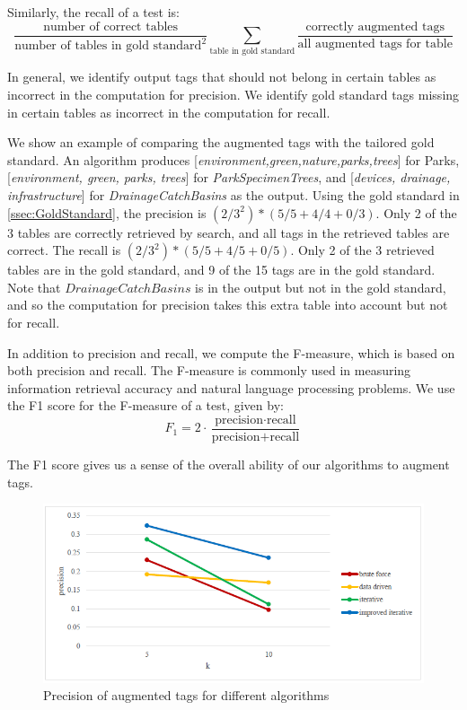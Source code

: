 Similarly, the recall of a test is:
\[
\frac{\text{number of correct tables}}{\text{number of tables in gold standard}^{2}}\sum\limits _{\text{table in gold standard}}\frac{\text{correctly augmented tags}}{\text{all augmented tags for table}}
\]

In general, we identify output tags that should not belong in certain tables as incorrect in the computation for precision. We identify gold standard tags missing in certain tables as incorrect in the computation for recall.

We show an example of comparing the augmented tags with the tailored gold standard. An algorithm produces [\textit{environment,green,nature,parks,trees}] for Parks, [\textit{environment, green, parks, trees}] for \textit{ParkSpecimenTrees}, and [\textit{devices, drainage, infrastructure}] for \textit{DrainageCatchBasins} as the output. Using the gold standard in \autoref{ssec:GoldStandard}, the precision is $(2/3^{2})*(5/5+4/4+0/3)$. Only 2 of the 3 tables are correctly retrieved by search, and all tags in the retrieved tables are correct. The recall is $(2/3^{2})*(5/5 + 4/5 + 0/5)$. Only 2 of the 3 retrieved tables are in the gold standard, and 9 of the 15 tags are in the gold standard. Note that $DrainageCatchBasins$ is in the output but not in the gold standard, and so the computation for precision takes this extra table into account but not for recall.

In addition to precision and recall, we compute the F-measure, which is based on both precision and recall. The F-measure is commonly used in measuring information retrieval accuracy and natural language processing problems. We use the F1 score for the F-measure of a test, given by:
\[
\ensuremath{F_{1}}=2\ensuremath{\cdot}\frac{\text{precision}\cdot\text{recall}}{\text{precision}+\text{recall}}
\]

The F1 score gives us a sense of the overall ability of our algorithms to augment tags.

\begin{figure}
    \centering
    \includegraphics[width=5in]{figures/precision-different-algorithms.png}
    \caption{Precision of augmented tags for different algorithms}
    \label{fig:precision-different-algorithms}
\end{figure}

